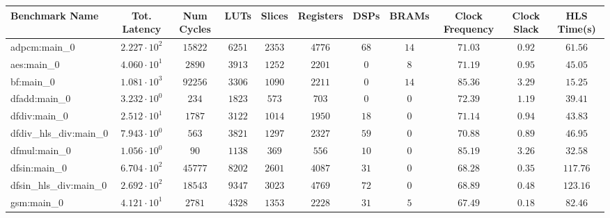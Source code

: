 \begin{tabular}{|l|c|c|c|c|c|c|c|c|c|c|}
\hline
Benchmark Name          & Tot. Latency           & Num Cycles & LUTs      & Slices    & Registers & DSPs    & BRAMs   & Clock Frequency & Clock Slack & HLS Time(s) \\
\hline
adpcm:main\_0           & $ 2.227 \cdot 10^{2} $ & $ 15822  $ & $ 6251  $ & $ 2353  $ & $ 4776  $ & $ 68  $ & $ 14  $ & $ 71.03       $ & $ 0.92    $ & $ 61.56   $ \\
aes:main\_0             & $ 4.060 \cdot 10^{1} $ & $ 2890   $ & $ 3913  $ & $ 1252  $ & $ 2201  $ & $ 0   $ & $ 8   $ & $ 71.19       $ & $ 0.95    $ & $ 45.05   $ \\
bf:main\_0              & $ 1.081 \cdot 10^{3} $ & $ 92256  $ & $ 3306  $ & $ 1090  $ & $ 2211  $ & $ 0   $ & $ 14  $ & $ 85.36       $ & $ 3.29    $ & $ 15.25   $ \\
dfadd:main\_0           & $ 3.232 \cdot 10^{0} $ & $ 234    $ & $ 1823  $ & $ 573   $ & $ 703   $ & $ 0   $ & $ 0   $ & $ 72.39       $ & $ 1.19    $ & $ 39.41   $ \\
dfdiv:main\_0           & $ 2.512 \cdot 10^{1} $ & $ 1787   $ & $ 3122  $ & $ 1014  $ & $ 1950  $ & $ 18  $ & $ 0   $ & $ 71.14       $ & $ 0.94    $ & $ 43.83   $ \\
dfdiv\_hls\_div:main\_0 & $ 7.943 \cdot 10^{0} $ & $ 563    $ & $ 3821  $ & $ 1297  $ & $ 2327  $ & $ 59  $ & $ 0   $ & $ 70.88       $ & $ 0.89    $ & $ 46.95   $ \\
dfmul:main\_0           & $ 1.056 \cdot 10^{0} $ & $ 90     $ & $ 1138  $ & $ 369   $ & $ 556   $ & $ 10  $ & $ 0   $ & $ 85.19       $ & $ 3.26    $ & $ 32.58   $ \\
dfsin:main\_0           & $ 6.704 \cdot 10^{2} $ & $ 45777  $ & $ 8202  $ & $ 2601  $ & $ 4087  $ & $ 31  $ & $ 0   $ & $ 68.28       $ & $ 0.35    $ & $ 117.76  $ \\
dfsin\_hls\_div:main\_0 & $ 2.692 \cdot 10^{2} $ & $ 18543  $ & $ 9347  $ & $ 3023  $ & $ 4769  $ & $ 72  $ & $ 0   $ & $ 68.89       $ & $ 0.48    $ & $ 123.16  $ \\
gsm:main\_0             & $ 4.121 \cdot 10^{1} $ & $ 2781   $ & $ 4328  $ & $ 1353  $ & $ 2228  $ & $ 31  $ & $ 5   $ & $ 67.49       $ & $ 0.18    $ & $ 82.46   $ \\

\end{tabular}
